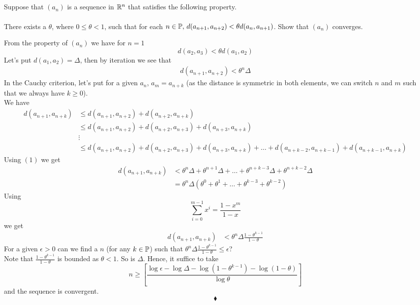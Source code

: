 \subsection{}
\begin{tcolorbox}
Suppose that $(a_n)$ is a sequence in $\mathbb{R}^n$ that satisfies the following property.\\\\ There exists a $\theta$, where $0\leq\theta<1$, such that for each $n \in\mathbb{P},\,  d(a_{n+1},a_{n+2})<\theta d(a_{n},a_{n+1})$. Show that $(a_n)$
converges.
\end{tcolorbox}
From the property of $(a_n)$ we have for $n=1$
$$d(a_{2},a_{3})<\theta d(a_{1},a_{2})$$
Let's put $d(a_{1},a_{2})=\Delta$, then by iteration we see that 
\begin{align}
d(a_{n+1},a_{n+2})<\theta^n\Delta
\end{align}
In the Cauchy criterion, let's put for a given $a_n$, $a_m= a_{n+k}$ (as the distance is symmetric in both elements, we can switch $n$ and $m$ such that we always have $k\geq 0$).\\
We have 
\begin{align*}
d(a_{n+1},a_{n+k})&\leq d(a_{n+1},a_{n+2})+d(a_{n+2},a_{n+k})\\
&\leq d(a_{n+1},a_{n+2})+d(a_{n+2},a_{n+3})+d(a_{n+3},a_{n+k})\\
&\vdots\\
&\leq d(a_{n+1},a_{n+2})+d(a_{n+2},a_{n+3})+d(a_{n+3},a_{n+k})+\dots +d(a_{n+k-2},a_{n+k-1})+d(a_{n+k-1},a_{n+k}) 
\end{align*}
Using $(1)$ we get 
\begin{align*}
d(a_{n+1},a_{n+k})&<\theta^{n}\Delta+\theta^{n+1}\Delta+\dots + \theta^{n+k-3}\Delta+\theta^{n+k-2}\Delta\\
&= \theta^n\Delta \left(\theta^{0}+\theta^{1}+\dots + \theta^{k-3}+\theta^{k-2}\right)
\end{align*}
Using 
$$\sum_{i=0}^{m-1}x^i= \frac{1-x^{m}}{1-x}$$ we get 
\begin{align*}
d(a_{n+1},a_{n+k})&<\theta^n\Delta \frac{1-\theta^{k-1}}{1-\theta}
\end{align*}
For a given $\epsilon>0$ can we find a $n$ (for any $k\in\mathbb{P}$) such that $\theta^n\Delta \frac{1-\theta^{k-1}}{1-\theta}\leq \epsilon$?\\
Note that $\frac{1-\theta^{k-1}}{1-\theta}$ is bounded as $\theta <1$. So is $\Delta$. Hence, it suffice to take 
$$n\geq \left[\frac{\log {\epsilon}-\log{\Delta}-\log{(1-\theta^{k-1})}-\log {(1-\theta)}}{\log\theta}\right]$$
and the sequence is convergent.
$$\blacklozenge$$\\

